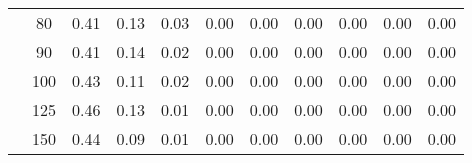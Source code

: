 \begin{table}[t]
\begin{center}
\begin{subtable}[c]{\textwidth}
\begin{center}
\begin{tabular}{rcccccccccc}
                                            & \multicolumn{1}{c|}{80}  & \num{0.41}  & \num{0.13}  & \num{0.03}  & \num{0.00}  & \num{0.00}  & \num{0.00}  & \num{0.00}  & \num{0.00}  & \num{0.00}  \\
                                            & \multicolumn{1}{c|}{90}  & \num{0.41}  & \num{0.14}  & \num{0.02}  & \num{0.00}  & \num{0.00}  & \num{0.00}  & \num{0.00}  & \num{0.00}  & \num{0.00}  \\
                                            & \multicolumn{1}{c|}{100}  & \num{0.43}  & \num{0.11}  & \num{0.02}  & \num{0.00}  & \num{0.00}  & \num{0.00}  & \num{0.00}  & \num{0.00}  & \num{0.00}  \\
                                            & \multicolumn{1}{c|}{125}  & \num{0.46}  & \num{0.13}  & \num{0.01}  & \num{0.00}  & \num{0.00}  & \num{0.00}  & \num{0.00}  & \num{0.00}  & \num{0.00}  \\
                                            & \multicolumn{1}{c|}{150}  & \num{0.44}  & \num{0.09}  & \num{0.01}  & \num{0.00}  & \num{0.00}  & \num{0.00}  & \num{0.00}  & \num{0.00}  & \num{0.00}  \\
                                    \end{tabular}
            \end{center}
        \end{subtable}

        \vspace{5mm}


\end{center}
\end{table}
